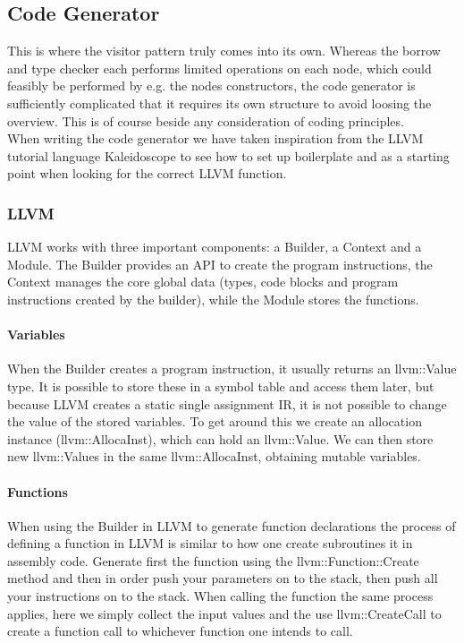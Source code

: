 \subsection{Code Generator}
\label{sec:CodeGenImplement}
This is where the visitor pattern truly comes into its own. Whereas the borrow and type checker each performs limited operations on each node, which could feasibly be performed by e.g. the nodes constructors, the code generator is sufficiently complicated that it requires its own structure to avoid loosing the overview. This is of course beside any consideration of coding principles.\\
When writing the code generator we have taken inspiration from the LLVM tutorial language Kaleidoscope \cite{LLVMTutorial} to see how to set up boilerplate and as a starting point when looking for the correct LLVM function.

\subsubsection{LLVM}
LLVM works with three important components: a Builder, a Context and a Module. The Builder provides an API to create the program instructions, the Context manages the core global data (types, code blocks and program instructions created by the builder), while the Module stores the functions.


\paragraph*{Variables}
When the Builder creates a program instruction, it usually returns an llvm::Value type. It is possible to store these in a symbol table and access them later, but because LLVM creates a static single assignment IR, it is not possible to change the value of the stored variables. To get around this we create an allocation instance (llvm::AllocaInst), which can hold an llvm::Value. We can then store new llvm::Values in the same llvm::AllocaInst, obtaining mutable variables.

\paragraph*{Functions}

When using the Builder in LLVM to generate function declarations the process of
defining a function in LLVM is similar to how one create subroutines it in assembly
code. Generate first the function using the llvm::Function::Create method and then in
order push your parameters on to the stack, then push all your instructions on to the
stack. When calling the function the same process applies, here we simply collect the
input values and the use llvm::CreateCall to create a function call to whichever
function one intends to call. \\

